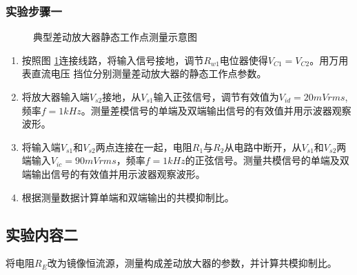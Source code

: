 \documentclass[a4paper,11pt,UTF8]{ctexart}
\begin{document}
	\subsubsection{实验步骤一}
	\begin{figure}[htbp]
		\centering
		\caption{典型差动放大器静态工作点测量示意图}
		\label{fig:nStatic}
	\end{figure}
	\begin{enumerate}
		\item 按照图 \ref{fig:nStatic}连接线路，将输入信号接地，调节$R_{w1}$电位器使得$V_{C1}=V_{C2}$。用万用表直流电压
		挡位分别测量差动放大器的静态工作点参数。
		\item 将放大器输入端$V_{s2}$接地，从$V_{s1}$输入正弦信号，调节有效值为$V_{id}=20mVrms$,频率$f=1kHz$。测量差模信号的单端及双端输出信号的有效值并用示波器观察波形。
		\item 将输入端$V_{s1}$和$V_{s2}$两点连接在一起，电阻$R_1$与$R_2$从电路中断开，从$V_{s1}$和$V_{s2}$两端输入$V_{ic}=90mVrms$，频率$f=1kHz$的正弦信号。测量共模信号的单端及双端输出信号的有效值并用示波器观察波形。
		\item 根据测量数据计算单端和双端输出的共模抑制比。
	\end{enumerate}
	\subsection{实验内容二}
	将电阻$R_E$改为镜像恒流源，测量构成差动放大器的参数，并计算共模抑制比。
\end{document}
